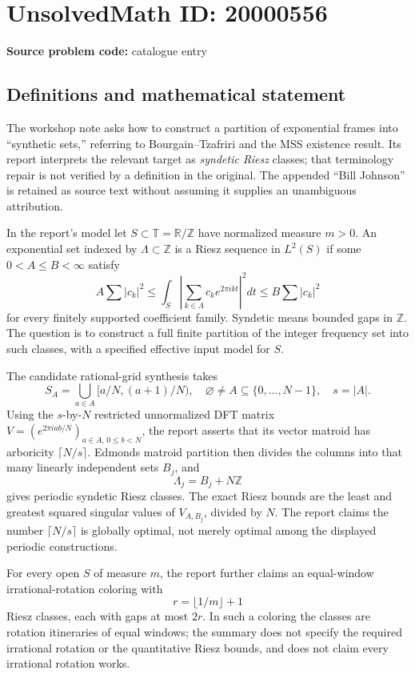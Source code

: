 \documentclass[11pt]{article}
\newcommand{\Z}{\mathbb{Z}}
\newcommand{\R}{\mathbb{R}}
\begin{document}
\section*{UnsolvedMath ID: 20000556}
\textbf{Source problem code:} catalogue entry
\subsection{Definitions and mathematical statement}
The workshop note asks how to construct a partition of exponential frames into ``synthetic sets,'' referring to Bourgain--Tzafriri and the MSS existence result. Its report interprets the relevant target as \emph{syndetic Riesz} classes; that terminology repair is not verified by a definition in the original. The appended ``Bill Johnson'' is retained as source text without assuming it supplies an unambiguous attribution.

In the report's model let \(S\subset\mathbb T=\R/\Z\) have normalized measure \(m>0\). An exponential set indexed by \(\Lambda\subset\Z\) is a Riesz sequence in \(L^2(S)\) if some \(0<A\leq B<\infty\) satisfy
\[
A\sum|c_k|^2\leq\int_S\left|\sum_{k\in\Lambda}c_ke^{2\pi ikt}\right|^2dt
\leq B\sum|c_k|^2
\]
for every finitely supported coefficient family. Syndetic means bounded gaps in \(\Z\). The question is to construct a full finite partition of the integer frequency set into such classes, with a specified effective input model for \(S\).

The candidate rational-grid synthesis takes
\[
S_A=\bigcup_{a\in A}[a/N,(a+1)/N),\quad
\varnothing\ne A\subseteq\{0,\ldots,N-1\},\quad s=|A|.
\]
Using the \(s\)-by-\(N\) restricted unnormalized DFT matrix \(V=(e^{2\pi iab/N})_{a\in A,\,0\leq b<N}\), the report asserts that its vector matroid has arboricity \(\lceil N/s\rceil\). Edmonds matroid partition then divides the columns into that many linearly independent sets \(B_j\), and
\[
\Lambda_j=B_j+N\Z
\]
gives periodic syndetic Riesz classes. The exact Riesz bounds are the least and greatest squared singular values of \(V_{A,B_j}\), divided by \(N\). The report claims the number \(\lceil N/s\rceil\) is globally optimal, not merely optimal among the displayed periodic constructions.

For every open \(S\) of measure \(m\), the report further claims an equal-window irrational-rotation coloring with
\[
r=\lfloor1/m\rfloor+1
\]
Riesz classes, each with gaps at most \(2r\). In such a coloring the classes are rotation itineraries of equal windows; the summary does not specify the required irrational rotation or the quantitative Riesz bounds, and does not claim every irrational rotation works.
\end{document}
